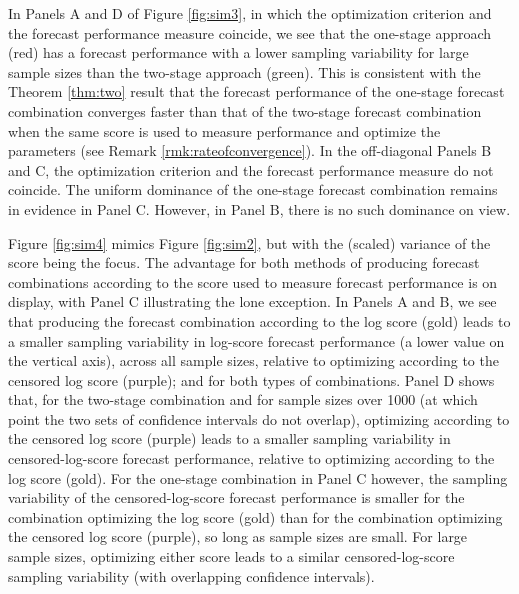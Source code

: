 \documentclass[12pt]{article}
\theoremstyle{definition}
\theoremstyle{remark}
\begin{document}
In Panels A and D of Figure \ref{fig:sim3}, in which the optimization criterion and the forecast performance measure coincide, we see that the one-stage approach (red) has a forecast performance with a lower sampling variability for large sample sizes than the two-stage approach (green). This is consistent with the Theorem \ref{thm:two} result that the forecast performance of the one-stage forecast combination converges faster than that of the two-stage forecast combination when the same score is used to measure performance and optimize the parameters (see Remark \ref{rmk:rateofconvergence}). In the off-diagonal Panels B and C, the optimization criterion and the forecast performance measure do not coincide. The uniform dominance of the one-stage forecast combination remains in evidence in Panel C. However, in Panel B, there is no such dominance on view.

Figure \ref{fig:sim4} mimics Figure \ref{fig:sim2}, but with the (scaled) variance of the score being the focus. The advantage for both methods of producing forecast combinations according to the score used to measure forecast performance is on display, with Panel C illustrating the lone exception. In Panels A and B, we see that producing the forecast combination according to the log score (gold) leads to a smaller sampling variability in log-score forecast performance (a lower value on the vertical axis), across all sample sizes, relative to optimizing according to the censored log score (purple); and for both types of combinations. Panel D shows that, for the two-stage combination and for sample sizes over 1000 (at which point the two sets of confidence intervals do not overlap), optimizing according to the censored log score (purple) leads to a smaller sampling variability in censored-log-score forecast performance, relative to optimizing according to the log score (gold). For the one-stage combination in Panel C however, the sampling variability of the censored-log-score forecast performance is smaller for the combination optimizing the log score (gold) than for the combination optimizing the censored log score (purple), so long as sample sizes are small. For large sample sizes, optimizing either score leads to a similar censored-log-score sampling variability (with overlapping confidence intervals).
\end{document}
